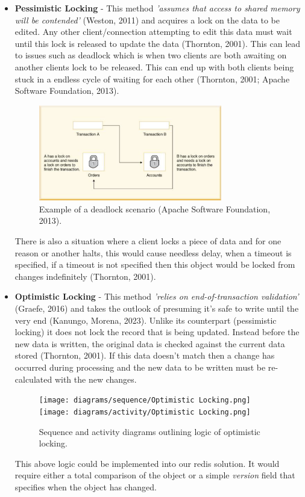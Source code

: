   \begin{itemize}
    \item \textbf{Pessimistic Locking} - This method \textit{'assumes that access to shared memory will be contended'} (Weston, 2011) and
    acquires a lock on the data to be edited. Any other client/connection attempting to edit this data must wait until this lock is released to update
    the data (Thornton, 2001). This can lead to issues such as deadlock which is when two clients are both awaiting on another clients lock to 
    be released. This can end up with both clients being stuck in a endless cycle of waiting for each other (Thornton, 2001; Apache Software Foundation, 2013).

    \begin{figure}[H]
      \centering
      \includegraphics[width=8cm]{assets/deadlock.png}
      \caption{Example of a deadlock scenario (Apache Software Foundation, 2013).}
      \label{fig:deadlock}
    \end{figure}

    There is also a situation where a client locks a piece of data and for one reason or another halts, this would cause needless delay, when a timeout is 
    specified, if a timeout is not specified then this object would be locked from changes indefinitely (Thornton, 2001).

    \item \textbf{Optimistic Locking} - This method \textit{'relies on end-of-transaction validation'} (Graefe, 2016) and takes the outlook of presuming
    it's safe to write until the very end (Kanungo, Morena, 2023). Unlike its counterpart (pessimistic locking) it does not lock the record that is 
    being updated. Instead before the new data is written, the original data is checked against the current data stored (Thornton, 2001). If this data doesn't
    match then a change has occurred during processing and the new data to be written must be re-calculated with the new changes.

    \begin{figure}[H]
      \centering
      \texttt{[image: diagrams/sequence/Optimistic Locking.png]}
      \texttt{[image: diagrams/activity/Optimistic Locking.png]}
      \caption{Sequence and activity diagrams outlining logic of optimistic locking.}
      \label{fig:optimisticLocking}
    \end{figure}

    This above logic could be implemented into our redis solution. It would require either a total comparison of the object or a simple \textit{version}
    field that specifies when the object has changed.
  \end{itemize}

